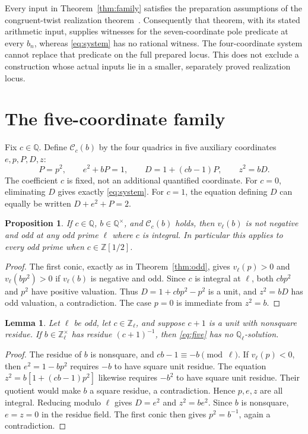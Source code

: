 \documentclass[10pt,a4paper]{article}
\newtheorem{lemma}[theorem]{Lemma}
\newtheorem{proposition}[theorem]{Proposition}
\newcommand{\Q}{\mathbb Q}
\newcommand{\Z}{\mathbb Z}
\begin{document}
Every input in Theorem~\ref{thm:family} satisfies the preparation
assumptions of the congruent-twist realization theorem~\cite{Pole}.
Consequently that theorem, with its stated arithmetic input, supplies
witnesses for the seven-coordinate pole predicate at every $b_n$,
whereas \eqref{eq:system} has no rational witness. The
four-coordinate system cannot replace that predicate on the full
prepared locus. This does not exclude a construction whose actual
inputs lie in a smaller, separately proved realization locus.

\section{The five-coordinate family}
Fix $c\in\Q$. Define $\mathcal C_c(b)$ by the four quadrics in
five auxiliary coordinates $e,p,P,D,z$:
\begin{equation}\label{eq:five}
 P=p^2,\qquad e^2+bP=1,\qquad
 D=1+(cb-1)P,\qquad z^2=bD.
\end{equation}
The coefficient $c$ is fixed, not an additional quantified coordinate.
For $c=0$, eliminating $D$ gives exactly \eqref{eq:system}.
For $c=1$, the equation defining $D$ can equally be written
$D+e^2+P=2$.

\begin{proposition}\label{prop:five-sound}
If $c\in\Q$, $b\in\Q^\times$, and $\mathcal C_c(b)$ holds,
then $v_\ell(b)$ is not negative and odd at any odd prime $\ell$
where $c$ is integral. In particular this applies to every odd prime
when $c\in\Z[1/2]$.
\end{proposition}
\begin{proof}
The first conic, exactly as in Theorem~\ref{thm:odd}, gives
$v_\ell(p)>0$ and $v_\ell(bp^2)>0$ if $v_\ell(b)$ is negative
and odd. Since $c$ is integral at $\ell$, both $cbp^2$ and $p^2$
have positive valuation. Thus $D=1+cbp^2-p^2$ is a unit, and
$z^2=bD$ has odd valuation, a contradiction. The case $p=0$ is
immediate from $z^2=b$.
\end{proof}

\begin{lemma}\label{lem:unit}
Let $\ell$ be odd, let $c\in\Z_\ell$, and suppose $c+1$ is a
unit with nonsquare residue. If $b\in\Z_\ell^\times$ has residue
$(c+1)^{-1}$, then \eqref{eq:five} has no $\Q_\ell$-solution.
\end{lemma}
\begin{proof}
The residue of $b$ is nonsquare, and $cb-1\equiv-b\pmod\ell$.
If $v_\ell(p)<0$, then $e^2=1-bp^2$ requires $-b$ to have
square unit residue. The equation
$z^2=b[1+(cb-1)p^2]$ likewise requires $-b^2$ to have square
unit residue. Their quotient would make $b$ a square residue,
a contradiction. Hence $p,e,z$ are all integral.
Reducing modulo $\ell$ gives $D=e^2$ and $z^2=be^2$.
Since $b$ is nonsquare, $e=z=0$ in the residue field. The first
conic then gives $p^2=b^{-1}$, again a contradiction.
\end{proof}
\end{document}
